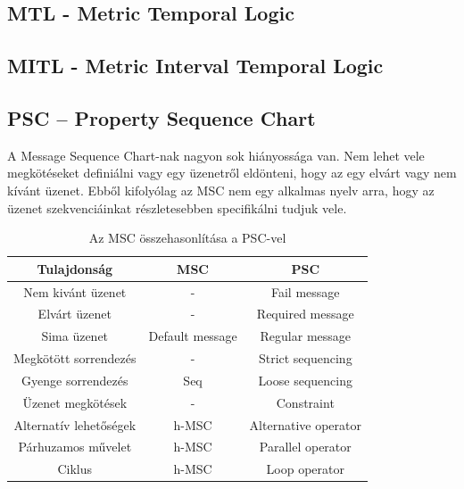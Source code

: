 \subsection{MTL - Metric Temporal Logic}
\subsection{MITL - Metric Interval Temporal Logic}
\subsection{PSC – Property Sequence Chart}
A Message Sequence Chart-nak nagyon sok hiányossága van.
Nem lehet vele megkötéseket definiálni vagy egy üzenetről eldönteni, hogy az egy elvárt vagy nem kívánt üzenet.
Ebből kifolyólag az MSC nem egy alkalmas nyelv arra, hogy az üzenet szekvenciáinkat részletesebben specifikálni tudjuk vele.

\begin{table}[ht]
    \centering %
    \begin{tabular}{ |c|c|c| } %
    \hline
    \textbf{Tulajdonság} & \textbf{MSC} & \textbf{PSC} \\ [0.5ex] %
    \hline %
    \hline
    Nem kivánt üzenet & - & Fail message \\ %
    \hline
    Elvárt üzenet & - & Required message \\
    \hline
    Sima üzenet & Default message & Regular message \\
    \hline
    Megkötött sorrendezés & - & Strict sequencing \\
    \hline
    Gyenge sorrendezés & Seq & Loose sequencing \\
    \hline
    Üzenet megkötések & - & Constraint \\
    \hline
    Alternatív lehetőségek & h-MSC & Alternative operator \\
    \hline
    Párhuzamos művelet & h-MSC & Parallel operator \\
    \hline
    Ciklus & h-MSC & Loop operator \\
    \hline %
    \end{tabular}
    \label{table:nonlin} %
    \caption{Az MSC összehasonlítása a PSC-vel} %
\end{table}

